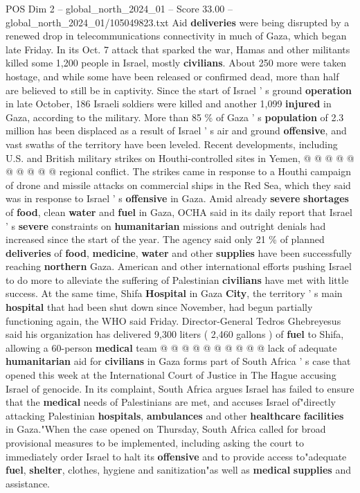 \begin{textsample}{POS Dim 2 – global\_north\_2024\_01 – Score 33.00 – global\_north\_2024\_01/105049823.txt}
Aid \textbf{deliveries} were being disrupted by a renewed drop in telecommunications connectivity in much of Gaza, which began late Friday.
In its Oct. 7 attack that sparked the war, Hamas and other militants killed some 1,200 people in Israel, mostly \textbf{civilians}.
About 250 more were taken hostage, and while some have been released or confirmed dead, more than half are believed to still be in captivity.
Since the start of Israel ' s ground \textbf{operation} in late October, 186 Israeli soldiers were killed and another 1,099 \textbf{injured} in Gaza, according to the military.
More than 85 \% of Gaza ' s \textbf{population} of 2.3 million has been displaced as a result of Israel ' s air and ground \textbf{offensive}, and vast swaths of the territory have been leveled.
Recent developments, including U.S. and British military strikes on Houthi-controlled sites in Yemen, @ @ @ @ @ @ @ @ @ @ regional conflict.
The strikes came in response to a Houthi campaign of drone and missile attacks on commercial ships in the Red Sea, which they said was in response to Israel ' s \textbf{offensive} in Gaza.
Amid already \textbf{severe} \textbf{shortages} of \textbf{food}, clean \textbf{water} and \textbf{fuel} in Gaza, OCHA said in its daily report that Israel ' s \textbf{severe} constraints on \textbf{humanitarian} missions and outright denials had increased since the start of the year.
The agency said only 21 \% of planned \textbf{deliveries} of \textbf{food}, \textbf{medicine}, \textbf{water} and other \textbf{supplies} have been successfully reaching \textbf{northern} Gaza.
American and other international efforts pushing Israel to do more to alleviate the suffering of Palestinian \textbf{civilians} have met with little success.
At the same time, Shifa \textbf{Hospital} in Gaza \textbf{City}, the territory ' s main \textbf{hospital} that had been shut down since November, had begun partially functioning again, the WHO said Friday.
Director-General Tedros Ghebreyesus said his organization has delivered 9,300 liters ( 2,460 gallons ) of \textbf{fuel} to Shifa, allowing a 60-person \textbf{medical} team @ @ @ @ @ @ @ @ @ @ lack of adequate \textbf{humanitarian} aid for \textbf{civilians} in Gaza forms part of South Africa ' s case that opened this week at the International Court of Justice in The Hague accusing Israel of genocide.
In its complaint, South Africa argues Israel has failed to ensure that the \textbf{medical} needs of Palestinians are met, and accuses Israel of"directly attacking Palestinian \textbf{hospitals}, \textbf{ambulances} and other \textbf{healthcare} \textbf{facilities} in Gaza."When the case opened on Thursday, South Africa called for broad provisional measures to be implemented, including asking the court to immediately order Israel to halt its \textbf{offensive} and to provide access to"adequate \textbf{fuel}, \textbf{shelter}, clothes, hygiene and sanitization"as well as \textbf{medical} \textbf{supplies} and assistance.

\end{textsample}
